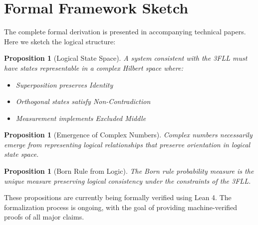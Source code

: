 \documentclass[12pt,a4paper]{article}
\newtheorem{proposition}[theorem]{Proposition}
\begin{document}
\section{Formal Framework Sketch}

The complete formal derivation is presented in accompanying technical papers. Here we sketch the logical structure:

\begin{proposition}[Logical State Space]
A system consistent with the 3FLL must have states representable in a complex Hilbert space where:
\begin{itemize}
\item Superposition preserves Identity
\item Orthogonal states satisfy Non-Contradiction
\item Measurement implements Excluded Middle
\end{itemize}
\end{proposition}

\begin{proposition}[Emergence of Complex Numbers]
Complex numbers necessarily emerge from representing logical relationships that preserve orientation in logical state space.
\end{proposition}

\begin{proposition}[Born Rule from Logic]
The Born rule probability measure is the unique measure preserving logical consistency under the constraints of the 3FLL.
\end{proposition}

These propositions are currently being formally verified using Lean 4. The formalization process is ongoing, with the goal of providing machine-verified proofs of all major claims.
\end{document}
